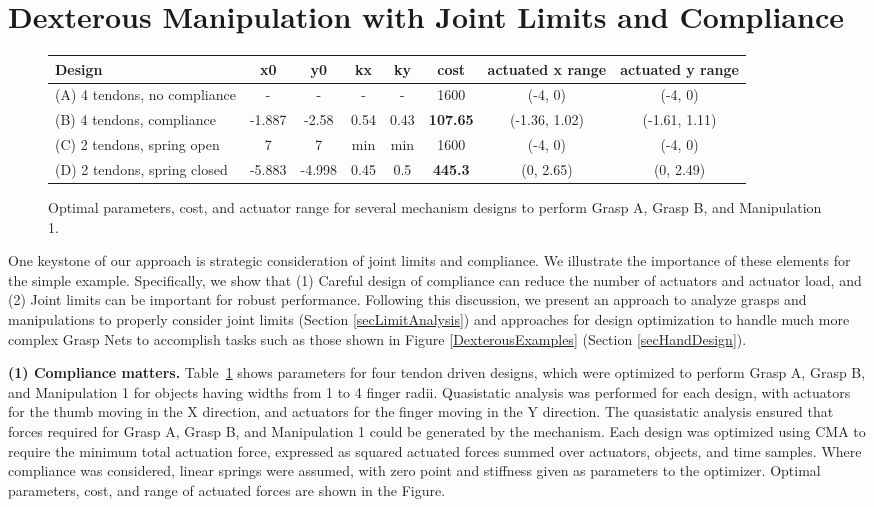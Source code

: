 \section{Dexterous Manipulation with Joint Limits and Compliance}
  \label{secManipAnalysis}

\begin{figure}
\begin{center}
\begin{tabular}{l|c|c|c|c|c|c|c|}
Design & x0 & y0 & kx & ky & cost &	actuated x range &	actuated y range \\ \hline
(A) 4 tendons, no compliance&	-&	-&	-&	-&	1600	&(-4, 0)	&(-4, 0)\\
(B) 4 tendons, compliance	&-1.887	&-2.58	&0.54&	0.43&	{\bf 107.65} &	(-1.36, 1.02)	&(-1.61, 1.11) \\
(C) 2 tendons, spring open&	7	&7	&min	&min	&1600	&(-4, 0)	&(-4, 0)\\
(D) 2 tendons, spring closed&	-5.883&	-4.998&	0.45&	0.5	& {\bf 445.3}  &	(0, 2.65)&	(0, 2.49)
\end{tabular}
\end{center}
\vspace*{-0.2in}
\caption{Optimal parameters, cost, and actuator range for several mechanism designs to perform Grasp A, Grasp B, and Manipulation 1.}
\label{ComplianceAnalysis}
\end{figure}

One keystone of our approach is strategic consideration of joint limits and compliance.  We illustrate the importance of these elements for the simple example.  Specifically, we show that (1) Careful design of compliance can reduce the number of actuators and actuator load, and (2) Joint limits can be important for robust performance.   Following this discussion, we present an approach to analyze grasps and manipulations to properly consider joint limits (Section \ref{secLimitAnalysis}) and approaches for design optimization to handle much more complex Grasp Nets to accomplish tasks such as those shown in Figure \ref{DexterousExamples} (Section \ref{secHandDesign}).

\smallskip\noindent
{\bf (1) Compliance matters.}  Table~\ref{ComplianceAnalysis} shows parameters for four tendon driven designs, which were optimized to perform Grasp A, Grasp B, and Manipulation 1 for objects  having widths from 1 to 4 finger radii.   Quasistatic analysis was performed for each design, with actuators for the thumb moving in the X direction, and actuators for the finger moving in the Y direction.  The quasistatic analysis ensured that forces required for Grasp A, Grasp B, and Manipulation 1 could be generated by the mechanism.   Each design was optimized using CMA \cite{hansen2006cma} to require the minimum total actuation force, expressed as squared actuated forces summed over actuators, objects, and time samples.    Where compliance was considered, linear springs were assumed, with zero point and stiffness given as parameters to the optimizer.   Optimal parameters, cost, and range of actuated forces are shown in the Figure.

